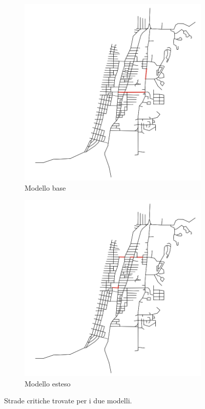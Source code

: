 \begin{figure}[ht]
    \centering
    \begin{subfigure}{0.45\textwidth}
        \centering
        \includegraphics[width=\textwidth]{images/analisi/comparison-base-critical-links.png}
        \caption{Modello base}
    \end{subfigure}
    \hfill
    \begin{subfigure}{0.45\textwidth}
        \centering
        \includegraphics[width=\textwidth]{images/analisi/comparison-new-critical-links.png}
        \caption{Modello esteso}
    \end{subfigure}
    \caption{Strade critiche trovate per i due modelli.}
    \label{fig:analisi-comparison-critical-links2}
\end{figure}

